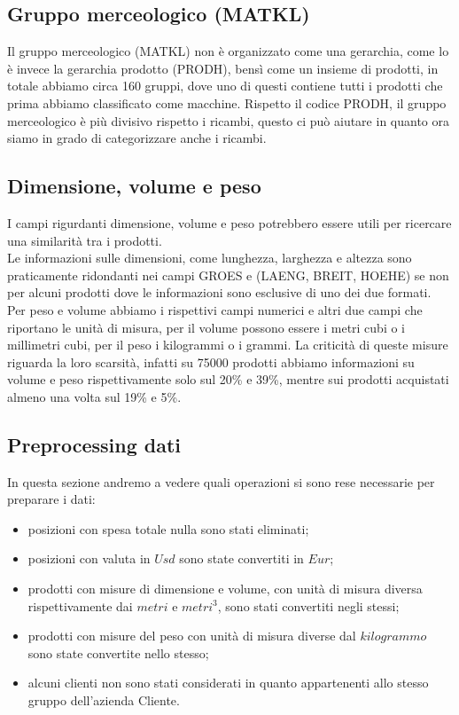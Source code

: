 \subsection{Gruppo merceologico (MATKL)}
Il gruppo merceologico (MATKL) non è organizzato come una gerarchia, come lo è invece la gerarchia prodotto (PRODH), bensì come un insieme di prodotti, in totale abbiamo circa 160 gruppi, dove uno di questi contiene tutti i prodotti che prima abbiamo classificato come macchine. Rispetto il codice PRODH, il gruppo merceologico è più divisivo rispetto i ricambi, questo ci può aiutare in quanto ora siamo in grado di categorizzare anche i ricambi. 

\subsection{Dimensione, volume e peso}
I campi rigurdanti dimensione, volume e peso potrebbero essere utili per ricercare una similarità tra i prodotti.\\
Le informazioni sulle dimensioni, come lunghezza, larghezza e altezza sono praticamente ridondanti nei campi GROES e (LAENG, BREIT, HOEHE) se non per alcuni prodotti dove le informazioni sono esclusive di uno dei due formati.\\
Per peso e volume abbiamo i rispettivi campi numerici e altri due campi che riportano le unità di misura, per il volume possono essere i metri cubi o i millimetri cubi, per il peso i kilogrammi o i grammi.
La criticità di queste misure riguarda la loro scarsità, infatti su 75000 prodotti abbiamo informazioni su volume e peso rispettivamente solo sul 20\% e 39\%, mentre sui prodotti acquistati almeno una volta sul 19\% e 5\%. 

\subsection{Preprocessing dati}
In questa sezione andremo a vedere quali operazioni si sono rese necessarie per preparare i dati:
\begin{itemize}
	\item posizioni con spesa totale nulla sono stati eliminati;
	\item posizioni con valuta in $Usd$ sono state convertiti in $Eur$;
	\item prodotti con misure di dimensione e volume, con unità di misura diversa rispettivamente dai $metri$ e $metri^3$, sono stati convertiti negli stessi;
	\item prodotti con misure del peso con unità di misura diverse dal $kilogrammo$ sono state convertite nello stesso;
	\item alcuni clienti non sono stati considerati in quanto appartenenti allo stesso gruppo dell'azienda Cliente.
\end{itemize}